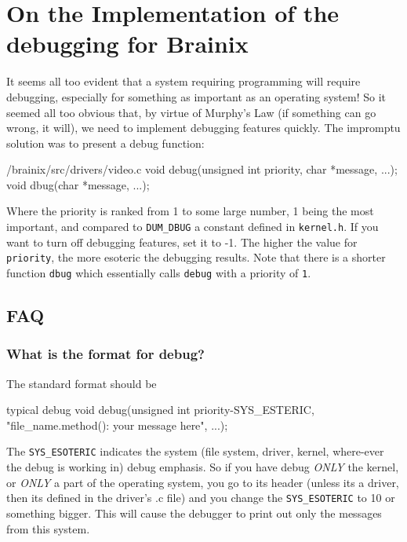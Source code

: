 
\chapter{On the Implementation of the debugging for Brainix}

%

It seems all too evident that a system requiring programming will require debugging, especially for something as important as an operating system! So it seemed all too obvious that, by virtue of Murphy's Law (if something can go wrong, it will), we need to implement debugging features quickly. The impromptu solution was to present a debug function:
\begin{code}{/brainix/src/drivers/video.c}
void debug(unsigned int priority, char *message, ...);
void dbug(char *message, ...);
\end{code}
Where the priority is ranked from 1 to some large number, 1 being the most important, and compared to \verb|DUM_DBUG| a constant defined in \verb|kernel.h|. If you want to turn off debugging features, set it to -1. The higher the value for \verb|priority|, the more esoteric the debugging results. Note that there is a shorter function \verb|dbug| which essentially calls \verb|debug| with a priority of \verb|1|.
\section{FAQ}
\subsection{What is the format for debug?}
The standard format should be
\begin{code}{typical debug}
void debug(unsigned int priority-SYS_ESTERIC, "file_name.method(): your message here", ...);
\end{code}
The \verb|SYS_ESOTERIC| indicates the system (file system, driver, kernel, where-ever the debug is working in) debug emphasis. So if you have debug \emph{ONLY} the kernel, or \emph{ONLY} a part of the operating system, you go to its header (unless its a driver, then its defined in the driver's .c file) and you change the \verb|SYS_ESOTERIC| to 10 or something bigger. This will cause the debugger to print out only the messages from this system.
